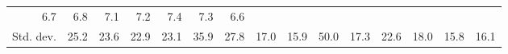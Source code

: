 \begin{tabular}{lllllllllllllll}
  \multicolumn{1}{r}{6.7} &
  \multicolumn{1}{r}{6.8} &
  \multicolumn{1}{r}{7.1} &
  \multicolumn{1}{r}{7.2} &
  \multicolumn{1}{r}{7.4} &
  \multicolumn{1}{r}{7.3} &
  \multicolumn{1}{r}{6.6} \\
\multicolumn{1}{l}{\hspace{2em}Std. dev.} &
  \multicolumn{1}{|r}{25.2} &
  \multicolumn{1}{r}{23.6} &
  \multicolumn{1}{r}{22.9} &
  \multicolumn{1}{r}{23.1} &
  \multicolumn{1}{r}{35.9} &
  \multicolumn{1}{r}{27.8} &
  \multicolumn{1}{r}{17.0} &
  \multicolumn{1}{r}{15.9} &
  \multicolumn{1}{r}{50.0} &
  \multicolumn{1}{r}{17.3} &
  \multicolumn{1}{r}{22.6} &
  \multicolumn{1}{r}{18.0} &
  \multicolumn{1}{r}{15.8} &
  \multicolumn{1}{r}{16.1} \\
\cline{1-15}
\end{tabular}
